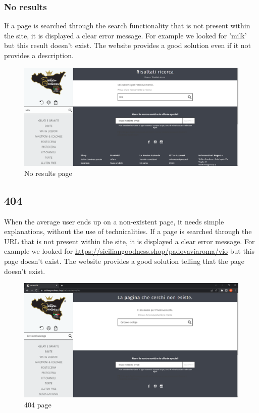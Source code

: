 \subsubsection{No results}
If a page is searched through the search functionality that is not present within the site, it is displayed a clear error message.
For example we looked for 'milk' but this result doesn't exist. The website provides a good solution even if it not provides a description.

\begin{figure}[H]
	\centering\includegraphics[width=12cm]{Img/noresult.png}
	\caption{No results page}
\end{figure}

\subsection{404}
When the average user ends up on a non-existent page, it needs simple explanations, without the use of technicalities.
If a page is searched through the URL that is not present within the site, it is displayed a clear error message.
For example we looked for \url{https://siciliangoodness.shop/padovaviaroma/vio} but this page doesn't exist. The website provides a good solution telling that the page doesn't exist.

\begin{figure}[H]
	\centering\includegraphics[width=12cm]{Img/404.png}
	\caption{404 page}
\end{figure}

